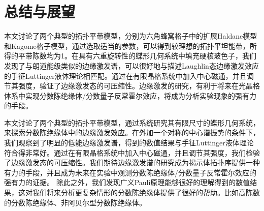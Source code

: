 \chapter{总结与展望}
\label{summary}

本文讨论了两个典型的拓扑平带模型，分别为六角蜂窝格子中的扩展Haldane模型和Kagome格子模型，通过选取适当的参数，可以得到较理想的拓扑平坦能带，所得的平带陈数均为1。在具有六重旋转性的蝶形几何系统中填充硬核玻色子，我们发现了与朗道能级类似的边缘激发谱，可以很好地与描述Laughlin态边缘激发效应的手征Luttinger液体理论相匹配。通过在有限晶格系统中加入中心磁通，并且调节其强度，验证了边缘激发态的可压缩性。边缘激发的研究，有利于将来在光晶格体系中实现分数陈绝缘体/分数量子反常霍尔效应，将成为分析实验现象的强有力的手段。

本文讨论了两个典型的拓扑平带模型，通过系统研究其有限尺寸的蝶形几何系统，来探索分数陈绝缘体中的边缘激发效应。在外加一个对称的中心谐振势的条件下，我们观察到了明显的低能边缘激发谱，得到的数值结果与手征Luttinger液体理论符合得非常好。通过在有限晶格系统中加入中心磁通，并且调节其强度，我们检验了边缘激发态的可压缩性。我们期待边缘激发谱的研究成为揭示体拓扑序提供一种有力的手段，并且成为未来在实验中观测分数陈绝缘体/分数量子反常霍尔效应的强有力的证据。
除此之外，我们发现广义Pauli原理能够很好的理解得到的数值结果，这对我们将来分析更复杂情形的分数陈绝缘体提供了很好的帮助。比如高陈数的分数陈绝缘体、非阿贝尔型分数陈绝缘体。
